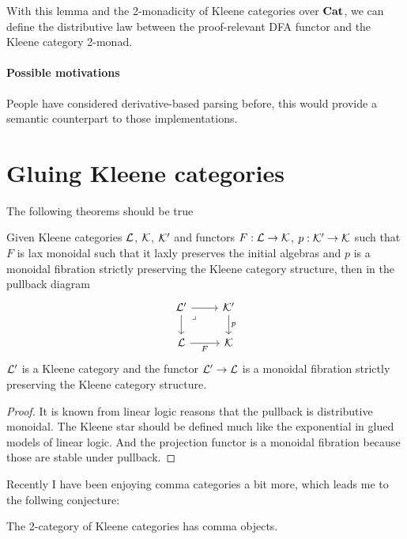 \documentclass[acmsmall,anonymous,review,screen]{acmart}
\newcommand{\cat}[1]{
  \relax
  \StrLen{#1}[\arglength]
  \ifnum\arglength=1
  \mathcal{#1}
  \else
  \mathbf{#1}
  \fi
}
\begin{document}
With this lemma and the 2-monadicity of Kleene categories over $\cat{Cat}$,
we can define the distributive law between the proof-relevant
DFA functor and the Kleene category 2-monad.

\paragraph{Possible motivations}

People have considered derivative-based parsing before, this would provide
a semantic counterpart to those implementations.


\section{Gluing Kleene categories}

The following theorems should be true
\begin{theorem}
  Given Kleene categories $\cat{L}$, $\cat{K}$, $\cat{K}'$
  and functors $F : \cat{L} \to \cat{K}$, $p : \cat{K}' \to \cat{K}$
  such that $F$ is lax monoidal such that it laxly preserves the initial
  algebras and $p$ is a monoidal fibration strictly preserving the
  Kleene category structure, then in the pullback diagram
\[\begin{tikzcd}
	{\cat{L}'} & {\cat{K}'} \\
	{\cat{L}} & {\cat{K}}
	\arrow[from=1-1, to=1-2]
	\arrow[from=1-1, to=2-1]
	\arrow["\lrcorner"{anchor=center, pos=0.125}, draw=none, from=1-1, to=2-2]
	\arrow["p", from=1-2, to=2-2]
	\arrow["F"', from=2-1, to=2-2]
\end{tikzcd}\]
$\cat{L}'$ is a Kleene category and the functor $\cat{L}'\to \cat{L}$ is a
monoidal fibration strictly preserving the Kleene category structure.
\end{theorem}
\begin{proof}
  It is known from linear logic reasons that the pullback is distributive monoidal.
  The Kleene star should be defined much like the exponential in glued models of
  linear logic. And the projection functor is a monoidal fibration because those
  are stable under pullback.
\end{proof}

Recently I have been enjoying comma categories a bit more, which leads me to the follwing
conjecture:

\begin{conjecture}
  The 2-category of Kleene categories has comma objects.
\end{conjecture}
\end{document}
